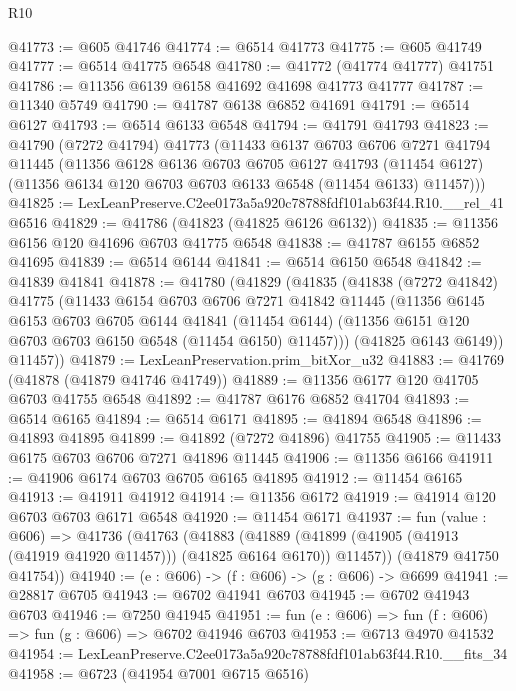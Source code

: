 \begin{lexlean}{R10}
\begin{coremodule}
@41773 := @605 @41746
@41774 := @6514 @41773
@41775 := @605 @41749
@41777 := @6514 @41775 @6548
@41780 := @41772 (@41774 @41777) @41751
@41786 := @11356 @6139 @6158 @41692 @41698 @41773 @41777
@41787 := @11340 @5749
@41790 := @41787 @6138 @6852 @41691
@41791 := @6514 @6127
@41793 := @6514 @6133 @6548
@41794 := @41791 @41793
@41823 := @41790
    (@7272 @41794)
    @41773
    (@11433
      @6137
      @6703
      @6706
      @7271
      @41794
      @11445
      (@11356
        @6128
        @6136
        @6703
        @6705
        @6127
        @41793
        (@11454 @6127)
        (@11356 @6134 @120 @6703 @6703 @6133 @6548 (@11454 @6133) @11457)))
@41825 := LexLeanPreserve.C2ee0173a5a920c78788fdf101ab63f44.R10.__rel_41 @6516
@41829 := @41786 (@41823 (@41825 @6126 @6132))
@41835 := @11356 @6156 @120 @41696 @6703 @41775 @6548
@41838 := @41787 @6155 @6852 @41695
@41839 := @6514 @6144
@41841 := @6514 @6150 @6548
@41842 := @41839 @41841
@41878 := @41780
    (@41829
      (@41835
        (@41838
          (@7272 @41842)
          @41775
          (@11433
            @6154
            @6703
            @6706
            @7271
            @41842
            @11445
            (@11356
              @6145
              @6153
              @6703
              @6705
              @6144
              @41841
              (@11454 @6144)
              (@11356 @6151 @120 @6703 @6703 @6150 @6548 (@11454 @6150) @11457)))
          (@41825 @6143 @6149))
        @11457))
@41879 := LexLeanPreservation.prim_bitXor_u32
@41883 := @41769 (@41878 (@41879 @41746 @41749))
@41889 := @11356 @6177 @120 @41705 @6703 @41755 @6548
@41892 := @41787 @6176 @6852 @41704
@41893 := @6514 @6165
@41894 := @6514 @6171
@41895 := @41894 @6548
@41896 := @41893 @41895
@41899 := @41892 (@7272 @41896) @41755
@41905 := @11433 @6175 @6703 @6706 @7271 @41896 @11445
@41906 := @11356 @6166
@41911 := @41906 @6174 @6703 @6705 @6165 @41895
@41912 := @11454 @6165
@41913 := @41911 @41912
@41914 := @11356 @6172
@41919 := @41914 @120 @6703 @6703 @6171 @6548
@41920 := @11454 @6171
@41937 := fun (value : @606) =>
  @41736
    (@41763
      (@41883
        (@41889 (@41899 (@41905 (@41913 (@41919 @41920 @11457))) (@41825 @6164 @6170)) @11457))
      (@41879 @41750 @41754))
@41940 := (e : @606) -> (f : @606) -> (g : @606) -> @6699
@41941 := @28817 @6705
@41943 := @6702 @41941 @6703
@41945 := @6702 @41943 @6703
@41946 := @7250 @41945
@41951 := fun (e : @606) => fun (f : @606) => fun (g : @606) => @6702 @41946 @6703
@41953 := @6713 @4970 @41532
@41954 := LexLeanPreserve.C2ee0173a5a920c78788fdf101ab63f44.R10.__fits_34
@41958 := @6723 (@41954 @7001 @6715 @6516)

\end{coremodule}
\end{lexlean}
